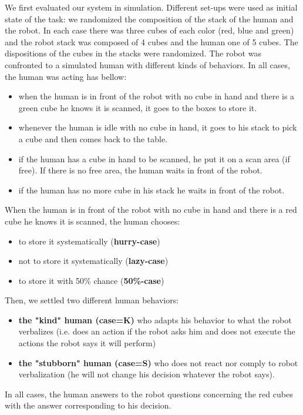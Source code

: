 \documentclass[english,a4paper,11pt,twoside]{StyleThese}
\begin{document}
We first evaluated our system in simulation. Different set-ups were used as initial state of the task: we randomized the composition of the stack of the human and the robot. In each case there was three cubes of each color (red, blue and green) and the robot stack was composed of 4 cubes and the human one of 5 cubes. The dispositions of the cubes in the stacks were randomized. The robot was confronted to a simulated human with different kinds of behaviors. In all cases, the human was acting has bellow:
\begin{itemize}
\item when the human is in front of the robot with no cube in hand and there is a green cube he knows it is scanned, it goes to the boxes to store it.
\item whenever the human is idle with no cube in hand, it goes to his stack to pick a cube and then comes back to the table.
\item if the human has a cube in hand to be scanned, he put it on a scan area (if free). If there is no free area, the human waits in front of the robot.
\item if the human has no more cube in his stack he waits in front of the robot.
\end{itemize}
When the human is in front of the robot with no cube in hand and there is a red cube he knows it is scanned, the human chooses:
\begin{itemize}
\item to store it systematically (\textbf{hurry-case})
\item not to store it systematically (\textbf{lazy-case})
\item to store it with 50\% chance (\textbf{50\%-case})
\end{itemize}
Then, we settled two different human behaviors:
\begin{itemize}
\item \textbf{the "kind" human (case=K)} who adapts his behavior to what the robot verbalizes (i.e. does an action if the robot asks him and does not execute the actions the robot says it will perform)
\item \textbf{the "stubborn" human (case=S)} who does not react nor comply to robot verbalization (he will not change his decision whatever the robot says).
\end{itemize}
In all cases, the human answers to the robot questions concerning the red cubes with the answer corresponding to his decision.
\end{document}
